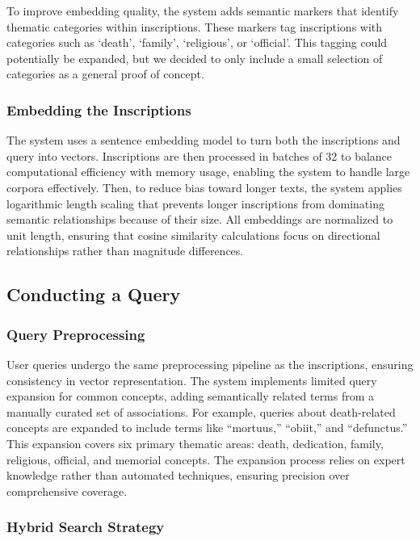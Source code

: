 \documentclass[final,greek,american]{anthology-ch}
\begin{document}
To improve embedding quality, the system adds semantic markers that identify thematic categories within inscriptions. These markers tag inscriptions with categories such as `death', `family', `religious', or `official'. This tagging could potentially be expanded, but we decided to only include a small selection of categories as a general proof of concept.

\subsubsection{Embedding the Inscriptions}
\label{sec:inscription_embedding}

The system uses a sentence embedding model to turn both the inscriptions and query into vectors. Inscriptions are then processed in batches of 32 to balance computational efficiency with memory usage, enabling the system to handle large corpora effectively.
Then, to reduce bias toward longer texts, the system applies logarithmic length scaling that prevents longer inscriptions from dominating semantic relationships because of their size. All embeddings are normalized to unit length, ensuring that cosine similarity calculations focus on directional relationships rather than magnitude differences.

\subsection{Conducting a Query}

\subsubsection{Query Preprocessing}

User queries undergo the same preprocessing pipeline as the inscriptions, ensuring consistency in vector representation. The system implements limited query expansion for common concepts, adding semantically related terms from a manually curated set of associations. For example, queries about death-related concepts are expanded to include terms like ``mortuus,'' ``obiit,'' and ``defunctus.'' This expansion covers six primary thematic areas: death, dedication, family, religious, official, and memorial concepts. The expansion process relies on expert knowledge rather than automated techniques, ensuring precision over comprehensive coverage.

\subsubsection{Hybrid Search Strategy}
\end{document}
